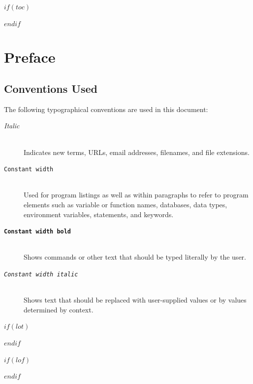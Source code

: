 \documentclass[
    $if(fontsize)$$fontsize$$else$10pt$endif$,
    $if(papersize)$$papersize$$else$letterpaper$endif$,
    titlepage,
    oneside,
    openright,
    $if(draft)$draft$else$final$endif$,
    article]{memoir}
\providecommand{\tightlist}{%
    \setlength{\itemsep}{0pt}\setlength{\parskip}{0pt}
}
\begin{document}
%
%
$if(toc)$
{
    \cleardoublepage
    \begin{KeepFromToc} %
        \tableofcontents
    \end{KeepFromToc}
    \pagebreak
    \cleardoublepage
}
$endif$



\chapter*{Preface}

\hypertarget{conventions}{%
\section{Conventions Used}\label{conventions}}

The following typographical conventions are used in this document:

\begin{description}
\item[\textnormal{\textit{Italic}}]\hfill \\
Indicates new terms, URLs, email addresses, filenames, and file
extensions.

\item[\textnormal{\texttt{Constant width}}]\hfill \\
Used for program listings as well as within paragraphs to refer to
program elements such as variable or function names, databases, data
types, environment variables, statements, and keywords.

\item[\textbf{\texttt{Constant width bold}}]\hfill \\
Shows commands or other text that should be typed literally by the user.

\item[\textnormal{\texttt{\textit{Constant width italic}}}]\hfill \\
Shows text that should be replaced with user-supplied values or by
values determined by context.
\end{description}



\pagebreak
\cleardoublepage



$if(lot)$
    \listoftables
$endif$

$if(lof)$
    \listoffigures
$endif$
\end{document}
